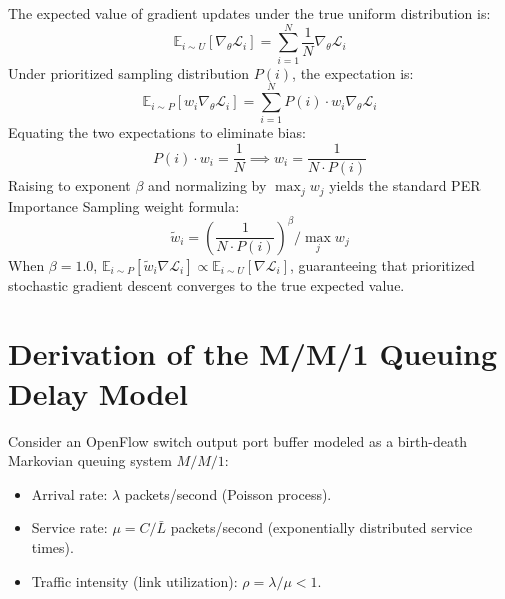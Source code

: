 The expected value of gradient updates under the true uniform distribution is:
\begin{equation}
    \mathbb{E}_{i \sim U}[\nabla_\theta \mathcal{L}_i] = \sum_{i=1}^N \frac{1}{N} \nabla_\theta \mathcal{L}_i
\end{equation}
Under prioritized sampling distribution $P(i)$, the expectation is:
\begin{equation}
    \mathbb{E}_{i \sim P}\left[ w_i \nabla_\theta \mathcal{L}_i \right] = \sum_{i=1}^N P(i) \cdot w_i \nabla_\theta \mathcal{L}_i
\end{equation}
Equating the two expectations to eliminate bias:
\begin{equation}
    P(i) \cdot w_i = \frac{1}{N} \implies w_i = \frac{1}{N \cdot P(i)}
\end{equation}
Raising to exponent $\beta$ and normalizing by $\max_j w_j$ yields the standard PER Importance Sampling weight formula:
\begin{equation}
    \tilde{w}_i = \left( \frac{1}{N \cdot P(i)} \right)^\beta \Big/ \max_j w_j
\end{equation}
When $\beta = 1.0$, $\mathbb{E}_{i \sim P}[\tilde{w}_i \nabla \mathcal{L}_i] \propto \mathbb{E}_{i \sim U}[\nabla \mathcal{L}_i]$, guaranteeing that prioritized stochastic gradient descent converges to the true expected value.

\section{Derivation of the M/M/1 Queuing Delay Model}
Consider an OpenFlow switch output port buffer modeled as a birth-death Markovian queuing system $M/M/1$:
\begin{itemize}
    \item Arrival rate: $\lambda$ packets/second (Poisson process).
    \item Service rate: $\mu = C / \bar{L}$ packets/second (exponentially distributed service times).
    \item Traffic intensity (link utilization): $\rho = \lambda / \mu < 1$.
\end{itemize}

